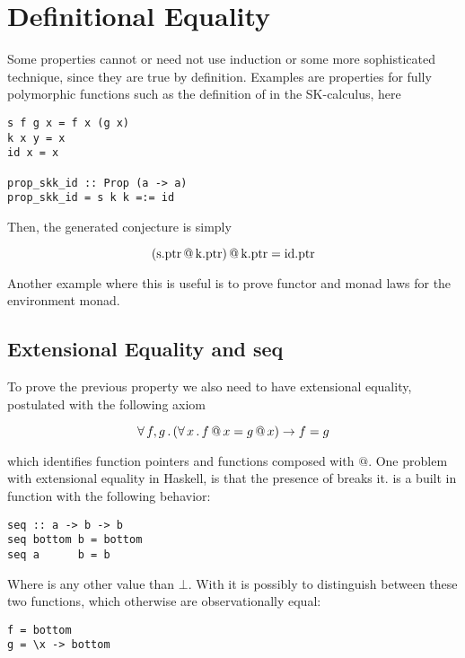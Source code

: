 \section{Definitional Equality}

Some properties cannot or need not use induction or some more
sophisticated technique, since they are true by definition. Examples
are properties for fully polymorphic functions such as the definition
of  in the SK-calculus, here

\begin{verbatim}
s f g x = f x (g x)
k x y = x
id x = x

prop_skk_id :: Prop (a -> a)
prop_skk_id = s k k =:= id
\end{verbatim}

Then, the generated conjecture is simply

\begin{equation*}
(\mathrm{s.ptr} \, @ \, \mathrm{k.ptr} )
     \, @ \, \mathrm{k.ptr} = \mathrm{id.ptr}
\end{equation*}

Another example where this is useful is to prove functor and monad
laws for the environment monad.

\subsection{Extensional Equality and seq}

To prove the previous property we also need to have extensional
equality, postulated with the following axiom

\begin{equation*}
\forall \, f , g \, . \, (\forall \, x \, . \, f \, @ \, x = g \, @ \, x) \rightarrow f = g
\end{equation*}

which identifies function pointers and functions composed with $@$.
One problem with extensional equality in Haskell, is that the presence
of  breaks it.  is a built in function with the
following behavior:

\begin{verbatim}
seq :: a -> b -> b
seq bottom b = bottom
seq a      b = b
\end{verbatim}

Where  is any other value than $\bot$. With  it is
possibly to distinguish between these two functions, which otherwise
are observationally equal:

\begin{verbatim}
f = bottom
g = \x -> bottom
\end{verbatim}

